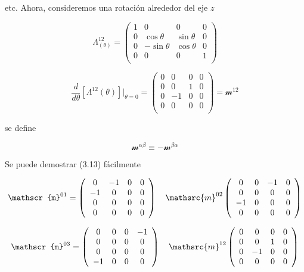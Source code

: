 \documentclass{report}
\begin{document}
etc. Ahora, consideremos una rotación alrededor del eje $z$


\[\Lambda_{(\theta)}^{12} = \left ( \begin{array}{cccc}
 1 & 0 & 0 & 0 \\
 0 & \cos \theta & \sin \theta &0 \\
 0 & -\sin \theta & \cos \theta &0 \\
 0 & 0 & 0 & 1 \\ \end{array} \right) 
\]

\[\frac{d}{d \theta}[\Lambda^{12}(\theta)]|_{\theta = 0} = \left ( \begin{array}{cccc}
 0 & 0 & 0 & 0 \\
 0 & 0 & 1 &0 \\
 0 & -1 & 0 &0 \\
0 & 0 & 0 &0 \\ \end{array} \right) = \mathscr{m}^{12}
\]

se define

\begin{equation}
\mathscr{m}^{\alpha \beta} \equiv - \mathscr{m}^{\beta \alpha}
\end{equation}

Se puede demostrar (3.13) fácilmente

\[\mathscr{m}^{01} = \left ( \begin{array}{cccc}
 0 & -1 & 0 & 0 \\
-1 & 0 & 0 &0 \\
0 & 0 & 0 &0 \\
0 & 0 & 0 &0 \\ \end{array} \right) \quad \mathsrc{m}^{02} \left ( \begin{array}{cccc}
 0 & 0 & -1 & 0 \\
 0 & 0 & 0 &0 \\
 -1 & 0 & 0 &0 \\
0 & 0 & 0 &0 \\ \end{array} \right)
\]

\[\mathscr{m}^{03} = \left ( \begin{array}{cccc}
 0 & 0 & 0 & -1 \\
 0 & 0 & 0 &0 \\
 0 & 0 & 0 &0 \\
 -1 & 0 & 0 &0 \\ \end{array} \right) \quad \mathsrc{m}^{12} \left ( \begin{array}{cccc}
 0 & 0 & 0 & 0 \\
 0 & 0 & 1 & 0 \\
 0 & -1 & 0 &0 \\
0 & 0 & 0 &0 \\ \end{array} \right)
\]
\end{document}
